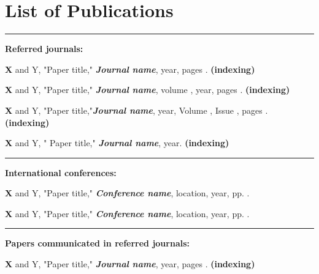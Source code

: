 \chapter*{List of Publications} \label{publications} %
\noindent\rule{\linewidth}{2pt}
\textbf{{\large Referred journals:}}
\begin{enumerate}[label=\textbf{[\arabic*]}]
	\item \textbf{X} and Y, "Paper title," \textit{\textbf{Journal name}}, year, pages . \textbf{(indexing)}
	\item \textbf{X} and Y, "Paper title," \textit{\textbf{Journal name}}, volume , year, pages . \textbf{(indexing)}
	\item \textbf{X} and Y, "Paper title,"\textit{\textbf{Journal name}}, year, Volume , Issue , pages .  \textbf{(indexing)}
	\item \textbf{X} and Y, " Paper title," \textit{\textbf{Journal name}}, year.  \textbf{(indexing)}	
\end{enumerate} 
\noindent\rule{\linewidth}{0.2pt}
\textbf{{\large International conferences:}}
\begin{enumerate}[label=\textbf{[\arabic*]}]
	\item \textbf{X} and Y, "Paper title," \textit{\textbf{Conference name}}, location, year, pp. .
	\item \textbf{X} and Y, "Paper title," \textit{\textbf{Conference name}}, location, year, pp. .
\end{enumerate}
\noindent\rule{\linewidth}{0.2pt}
\textbf{{\large Papers communicated in referred journals:}}
\begin{enumerate}[label=\textbf{[\arabic*]}]
	\item \textbf{X} and Y, "Paper title," \textit{\textbf{Journal name}}, year, pages . \textbf{(indexing)}
\end{enumerate} 